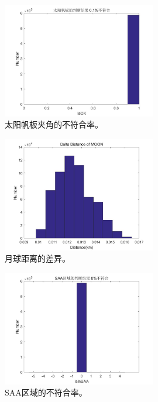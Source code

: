 \begin{figure}
\centering
\includegraphics[width=0.6\textwidth]{figs/check_results/solar_panel_disagreement.png}
\caption{太阳帆板夹角的不符合率。}
\label{0411_check_results2}
\end{figure}

\begin{figure}
\centering
\includegraphics[width=0.6\textwidth]{figs/check_results/delta_distance_of_moon.png}
\caption{月球距离的差异。}
\label{0411_check_results3}
\end{figure}

\begin{figure}
\centering
\includegraphics[width=0.6\textwidth]{figs/check_results/saa_disagreement.png}
\caption{SAA区域的不符合率。}
\label{0411_check_results4}
\end{figure}

